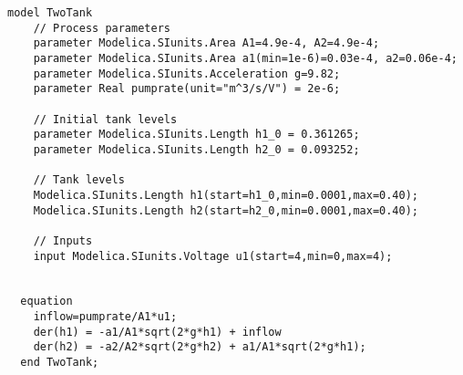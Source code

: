 
\lstset{language=modelica}
\begin{lstlisting}
model TwoTank
    // Process parameters
	parameter Modelica.SIunits.Area A1=4.9e-4, A2=4.9e-4;
	parameter Modelica.SIunits.Area a1(min=1e-6)=0.03e-4, a2=0.06e-4;
	parameter Modelica.SIunits.Acceleration g=9.82;
	parameter Real pumprate(unit="m^3/s/V") = 2e-6;

    // Initial tank levels
	parameter Modelica.SIunits.Length h1_0 = 0.361265;
	parameter Modelica.SIunits.Length h2_0 = 0.093252;

    // Tank levels
	Modelica.SIunits.Length h1(start=h1_0,min=0.0001,max=0.40);
	Modelica.SIunits.Length h2(start=h2_0,min=0.0001,max=0.40);

	// Inputs
	input Modelica.SIunits.Voltage u1(start=4,min=0,max=4);


  equation
    inflow=pumprate/A1*u1;
    der(h1) = -a1/A1*sqrt(2*g*h1) + inflow 
	der(h2) = -a2/A2*sqrt(2*g*h2) + a1/A1*sqrt(2*g*h1);
  end TwoTank;
\end{lstlisting}
